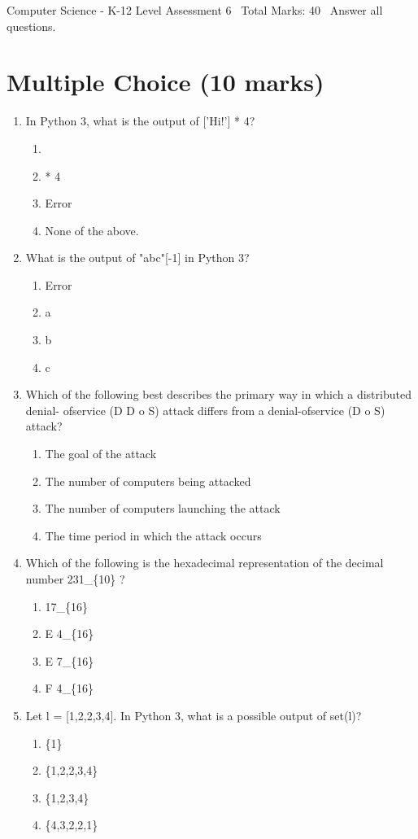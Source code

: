 \documentclass[12pt]{article}
\begin{document}
\begin{center}
Computer Science - K-12 Level Assessment 6 \
Total Marks: 40 \
Answer all questions.
\end{center}

\section*{Multiple Choice (10 marks)}
\begin{enumerate}[label=\arabic*.]
\item In Python 3, what is the output of ['Hi!'] * 4?
\begin{enumerate}[label=(\alph*)]
    \item ['Hi!', 'Hi!', 'Hi!', 'Hi!']
    \item ['Hi!'] * 4
    \item Error
    \item None of the above.
\end{enumerate}
\item What is the output of "abc"[-1] in Python 3?
\begin{enumerate}[label=(\alph*)]
    \item Error
    \item a
    \item b
    \item c
\end{enumerate}
\item Which of the following best describes the primary way in which a distributed denial- ofservice (D D o S) attack differs from a denial-ofservice (D o S) attack?
\begin{enumerate}[label=(\alph*)]
    \item The goal of the attack
    \item The number of computers being attacked
    \item The number of computers launching the attack
    \item The time period in which the attack occurs
\end{enumerate}
\item Which of the following is the hexadecimal representation of the decimal number 231\_\{10\} ?
\begin{enumerate}[label=(\alph*)]
    \item 17\_\{16\}
    \item E 4\_\{16\}
    \item E 7\_\{16\}
    \item F 4\_\{16\}
\end{enumerate}
\item Let l = [1,2,2,3,4]. In Python 3, what is a possible output of set(l)?
\begin{enumerate}[label=(\alph*)]
    \item \{1\}
    \item \{1,2,2,3,4\}
    \item \{1,2,3,4\}
    \item \{4,3,2,2,1\}
\end{enumerate}
\end{enumerate}
\end{document}
